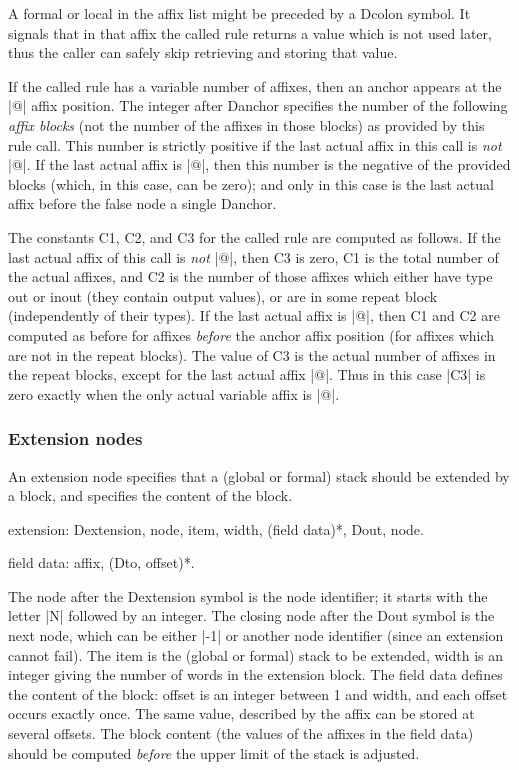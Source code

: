 \documentclass[titlepage]{article}
\newenvironment{grammar}{%
\begin{list}{}{%
\setlength\leftmargin{18pt}%
\setlength\rightmargin{-5pt}%
\setlength\listparindent{20pt}%
\setlength\itemsep{1pt plus0.2ex}%
\setlength\parsep{0pt plus 2pt}%
\setlength\labelsep{-5pt}%
}\color{blue!90!black}\sf\mkoptions%
}{\end{list}}
\newcommand\g[1]{\textsf{\color{blue!90!black}#1}}
\begin{document}
A \g{formal} or \g{local} in the affix list might be preceded by a
\g{Dcolon} symbol. It signals that in that affix the called rule returns a
value which is not used later, thus the caller can safely skip retrieving
and storing that value.

\smallskip

If the called rule has a variable number of affixes, then an \g{anchor}
appears at the \pp|@| affix position. The \g{integer} after \g{Danchor}
specifies the number of the following \emph{affix blocks} (not the number of
the affixes in those blocks) as provided by this rule call. This number is
strictly positive if the last actual affix in this call is \emph{not}
\pp|@|. If the last actual affix is \pp|@|, then this number is the negative
of the provided blocks (which, in this case, can be zero); and only in this
case is the last actual affix before the \g{false node} a single
\g{Danchor}.

\smallskip

The constants \g{C1}, \g{C2}, and \g{C3} for the called rule are computed as
follows. If the last actual affix of this call is \emph{not} \pp|@|, then
\g{C3} is zero, \g{C1} is the total number of the actual affixes, and \g{C2}
is the number of those affixes which either have type out or inout (they
contain output values), or are in some repeat block (independently of their
types). If the last actual affix is \pp|@|, then \g{C1} and \g{C2} are
computed as before for affixes \emph{before} the anchor affix position (for
affixes which are not in the repeat blocks). The value of \g{C3} is the
actual number of affixes in the repeat blocks, except for the last actual
affix \pp|@|. Thus in this case \pp|C3| is zero exactly when the only
actual variable affix is \pp|@|.

\subsubsection{Extension nodes}

An extension node specifies that a (global or formal) stack should be
extended by a block, and specifies the content of the block.
\begin{grammar}
\item extension: Dextension, node, item, width, (field data)*, Dout, node.
\item field data: affix, (Dto, offset)*.
\end{grammar}
The \g{node} after the \g{Dextension} symbol is the node identifier; it
starts with the letter \pp|N| followed by an integer. The closing \g{node}
after the \g{Dout} symbol is the next node, which can be either \pp|-1| or
another node identifier (since an extension cannot fail). The \g{item} is 
the (global or formal) stack to be
extended, \g{width} is an integer giving the number of words in the
extension block. The \g{field data} defines the content of the block: \g{offset}
is an integer between 1 and \g{width}, and each offset occurs exactly once. The
same value, described by the \g{affix} can be stored at several offsets. The
block content (the values of the \g{affix}es in the \g{field data}) should
be computed \emph{before} the upper limit of the stack is adjusted.
\end{document}
